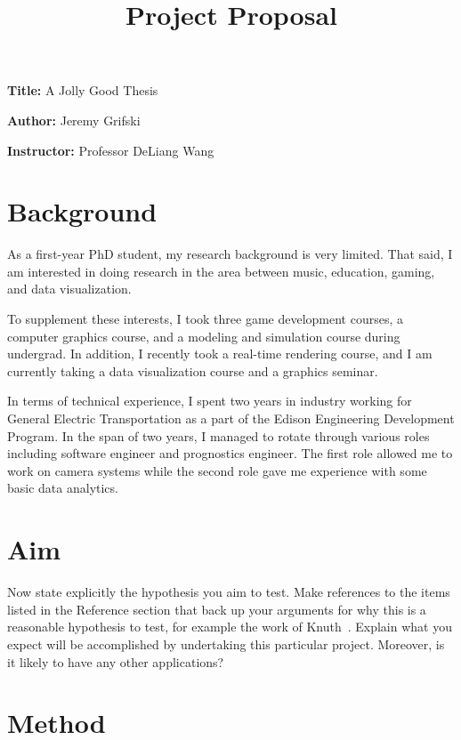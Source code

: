 \documentclass[12pt, a4paper]{article}
\title{Project Proposal}
\author{}
\date{}
\newcommand{\namelistlabel}[1]{\mbox{#1}\hfil}
\newenvironment{namelist}[1]{%
\begin{list}{}
    {
        \let\makelabel\namelistlabel
        \settowidth{\labelwidth}{#1}
        \setlength{\leftmargin}{1.1\labelwidth}
    }
  }{%
\end{list}}
\begin{document}
\maketitle

\begin{namelist}{xxxxxxxxxxxx}
\item[{\bf Title:}]
	A Jolly Good Thesis
\item[{\bf Author:}]
	Jeremy Grifski
\item[{\bf Instructor:}]
	Professor DeLiang Wang
\end{namelist}

\section*{Background}

As a first-year PhD student, my research background is very limited. That said,
I am interested in doing research in the area between music, education, gaming,
and data visualization.

To supplement these interests, I took three game development courses, a
computer graphics course, and a modeling and simulation course during undergrad.
In addition, I recently took a real-time rendering course, and I am
currently taking a data visualization course and a graphics seminar.

In terms of technical experience, I spent two years in industry working for
General Electric Transportation as a part of the Edison Engineering Development
Program. In the span of two years, I managed to rotate through various roles
including software engineer and prognostics engineer. The first role allowed
me to work on camera systems while the second role gave me experience with
some basic data analytics.

\section*{Aim}

Now state explicitly the hypothesis you aim to
test. Make references to the items listed in the Reference section
that back up your arguments for why this is a reasonable
hypothesis to test, for example the work of Knuth~\cite{knuth}.
Explain what you expect will be accomplished by undertaking this
particular project.  Moreover, is it likely to have any other
applications?

\section*{Method}
\end{document}
